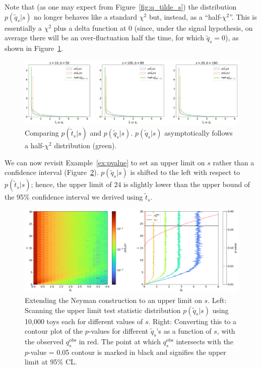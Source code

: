 Note that (as one may expect from Figure~\ref{fig:q_tilde_s}) the distribution $p(\tilde{q}_s|s)$ no longer behaves like a standard $\chi^2$ but, instead, as a ``half-$\chi^2$''.
This is essentially a $\chi^2$ plus a delta function at 0 (since, under the signal hypothesis, on average there will be an over-fluctuation half the time, for which $\tilde{q}_s = 0$), as shown in Figure~\ref{fig:p_tilde_q}.

\begin{figure}[htb]
\centering
\includegraphics[width=\textwidth]{figures/03-intervals-and-limits/3.png}
\caption{Comparing $p(\tilde{t}_s|s)$ and $p(\tilde{q}_s|s)$. $p(\tilde{q}_s|s)$ asymptotically follows a half-$\chi^2$ distribution (green).}
\label{fig:p_tilde_q}
\end{figure}

We can now revisit Example~\ref{ex:pvalue} to set an upper limit on $s$ rather than a confidence interval (Figure~\ref{fig:upperlimits}).
$p(\tilde{q}_s|s)$ is shifted to the left with respect to $p(\tilde{t}_s|s)$; hence, the upper limit of $24$ is slightly lower than the upper bound of the 95\% confidence interval we derived using $\tilde{t}_s$.

\begin{figure}[htb]
\centering
\includegraphics[width=\textwidth]{figures/03-intervals-and-limits/4.png}
\caption[Extending the Neyman construction to an upper limit on $s$.]{Extending the Neyman construction to an upper limit on $s$.
Left: Scanning the upper limit test statistic distribution $p(\tilde{q}_s|s)$ using 10,000 toys each for different values of $s$.
Right: Converting this to a contour plot of the $p$-values for different $\tilde{q}_s$'s as a function of $s$, with the observed $q^{\mathrm{obs}}_s$ in red.
The point at which $q^{\mathrm{obs}}_s$ intersects with the $p$-value = 0.05 contour is marked in black and signifies the upper limit at 95\% CL.}
\label{fig:upperlimits}
\end{figure}

